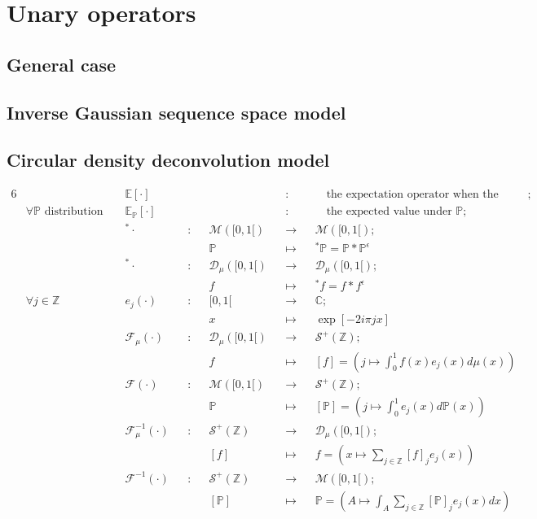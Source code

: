 \section*{Unary operators}
\subsection*{General case}
\subsection*{Inverse Gaussian sequence space model}
\subsection*{Circular density deconvolution model}
\begin{alignat*}{6}
& &&\mathds{E}[\cdot] && && &&:&& \quad \text{the expectation operator when the distribution is obvious};\\
& \forall \mathds{P} \text{ distribution } && \mathds{E}_{\mathds{P}}[\cdot] && && &&:&& \quad \text{the expected value under } \mathds{P};\\
& && ^{*}\cdot &&:&& \mathcal{M}([0, 1[) && \rightarrow && \mathcal{M}([0, 1[);\\
& && && && \mathds{P} && \mapsto && ^{*}\mathds{P} = \mathds{P}*\mathds{P}^{\epsilon}\\
& && ^{*}\cdot &&:&& \mathcal{D}_{\mu}([0, 1[) && \rightarrow && \mathcal{D}_{\mu}([0, 1[);\\
& && && && f && \mapsto && ^{*}f = f*f^{\epsilon}\\
& \forall j \in \mathds{Z} && e_{j}(\cdot) &&:&& [0,1[ && \rightarrow && \mathds{C};\\
& && && && x && \mapsto && \exp[-2 i \pi j x]\\
& && \mathcal{F}_{\mu}(\cdot) &&:&& \mathcal{D}_{\mu}([0, 1[) && \rightarrow && \mathcal{S}^{+}(\mathds{Z});\\
& && && && f && \mapsto && [f] = \left(j \mapsto \int_{0}^{1} f(x) e_{j}(x) d\mu(x)\right)\\
& && \mathcal{F}(\cdot) &&:&& \mathcal{M}([0, 1[) && \rightarrow && \mathcal{S}^{+}(\mathds{Z});\\
& && && && \mathds{P} && \mapsto && [\mathds{P}] = \left(j \mapsto \int_{0}^{1} e_{j}(x) d\mathds{P}(x)\right)\\
& && \mathcal{F}_{\mu}^{-1}(\cdot) &&:&& \mathcal{S}^{+}(\mathds{Z}) && \rightarrow && \mathcal{D}_{\mu}([0, 1[);\\
& && && && [f] && \mapsto && f = \left(x \mapsto \sum\limits_{j \in \mathds{Z}} [f]_{j} e_{j}(x) \right)\\
& && \mathcal{F}^{-1}(\cdot) &&:&& \mathcal{S}^{+}(\mathds{Z}) && \rightarrow && \mathcal{M}([0, 1[);\\
& && && && [\mathds{P}] && \mapsto && \mathds{P} = \left(A \mapsto \int_{A} \sum\limits_{j \in \mathds{Z}} [\mathds{P}]_{j} e_{j}(x) dx\right)\\
\end{alignat*}

